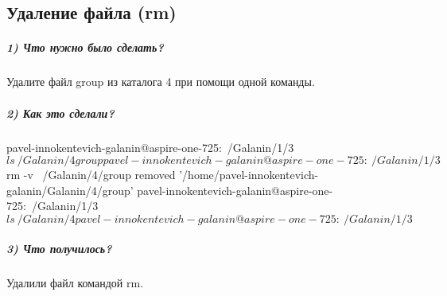 \subsection{Удаление файла (rm)}

\subparagraph{1) Что нужно было сделать?}

Удалите файл group из каталога 4 при помощи одной команды.

\subparagraph{2) Как это сделали?}

\begin{MyVerbatimCode}[label=Debian terminal]
pavel-innokentevich-galanin@aspire-one-725:~/Galanin/1/3$ ls ~/Galanin/4
group
pavel-innokentevich-galanin@aspire-one-725:~/Galanin/1/3$ rm -v ~/Galanin/4/group
removed '/home/pavel-innokentevich-galanin/Galanin/4/group'
pavel-innokentevich-galanin@aspire-one-725:~/Galanin/1/3$ ls ~/Galanin/4
pavel-innokentevich-galanin@aspire-one-725:~/Galanin/1/3$ 
\end{MyVerbatimCode}

\subparagraph{3) Что получилось?}

Удалили файл командой rm.
